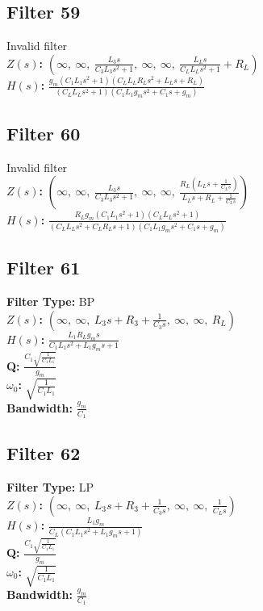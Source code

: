 \documentclass{article}
\begin{document}
\subsection*{Filter 59}
Invalid filter \\ 
\textbf{$Z(s)$:} $\left( \infty, \  \infty, \  \frac{L_{3} s}{C_{3} L_{3} s^{2} + 1}, \  \infty, \  \infty, \  \frac{L_{L} s}{C_{L} L_{L} s^{2} + 1} + R_{L}\right)$ \\ 
\textbf{$H(s)$:} $\frac{g_{m} \left(C_{1} L_{1} s^{2} + 1\right) \left(C_{L} L_{L} R_{L} s^{2} + L_{L} s + R_{L}\right)}{\left(C_{L} L_{L} s^{2} + 1\right) \left(C_{1} L_{1} g_{m} s^{2} + C_{1} s + g_{m}\right)}$ \\ 
\subsection*{Filter 60}
Invalid filter \\ 
\textbf{$Z(s)$:} $\left( \infty, \  \infty, \  \frac{L_{3} s}{C_{3} L_{3} s^{2} + 1}, \  \infty, \  \infty, \  \frac{R_{L} \left(L_{L} s + \frac{1}{C_{L} s}\right)}{L_{L} s + R_{L} + \frac{1}{C_{L} s}}\right)$ \\ 
\textbf{$H(s)$:} $\frac{R_{L} g_{m} \left(C_{1} L_{1} s^{2} + 1\right) \left(C_{L} L_{L} s^{2} + 1\right)}{\left(C_{L} L_{L} s^{2} + C_{L} R_{L} s + 1\right) \left(C_{1} L_{1} g_{m} s^{2} + C_{1} s + g_{m}\right)}$ \\ 
\subsection*{Filter 61}
\textbf{Filter Type:} BP \\ 
\textbf{$Z(s)$:} $\left( \infty, \  \infty, \  L_{3} s + R_{3} + \frac{1}{C_{3} s}, \  \infty, \  \infty, \  R_{L}\right)$ \\ 
\textbf{$H(s)$:} $\frac{L_{1} R_{L} g_{m} s}{C_{1} L_{1} s^{2} + L_{1} g_{m} s + 1}$ \\ 
\textbf{Q:} $\frac{C_{1} \sqrt{\frac{1}{C_{1} L_{1}}}}{g_{m}}$ \\ 
\textbf{$\omega_0$:} $\sqrt{\frac{1}{C_{1} L_{1}}}$ \\ 
\textbf{Bandwidth:} $\frac{g_{m}}{C_{1}}$ \\ 
\subsection*{Filter 62}
\textbf{Filter Type:} LP \\ 
\textbf{$Z(s)$:} $\left( \infty, \  \infty, \  L_{3} s + R_{3} + \frac{1}{C_{3} s}, \  \infty, \  \infty, \  \frac{1}{C_{L} s}\right)$ \\ 
\textbf{$H(s)$:} $\frac{L_{1} g_{m}}{C_{L} \left(C_{1} L_{1} s^{2} + L_{1} g_{m} s + 1\right)}$ \\ 
\textbf{Q:} $\frac{C_{1} \sqrt{\frac{1}{C_{1} L_{1}}}}{g_{m}}$ \\ 
\textbf{$\omega_0$:} $\sqrt{\frac{1}{C_{1} L_{1}}}$ \\ 
\textbf{Bandwidth:} $\frac{g_{m}}{C_{1}}$ \\ 
\end{document}
